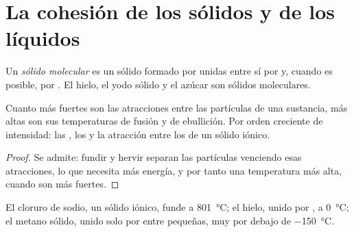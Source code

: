\section{La cohesión de los sólidos y de los líquidos}

\begin{definition}\label{def:g11:polarity-and-cohesion:molecular-solid}
Un \emph{sólido molecular} es un sólido formado
por  unidas entre sí por  y,
cuando es posible, por . El hielo, el yodo sólido y
el azúcar son sólidos moleculares.
\end{definition}

\begin{proposition}\label{prop:g11:polarity-and-cohesion:cohesion}
Cuanto más fuertes son las atracciones entre las partículas de una
sustancia, más altas son sus temperaturas de fusión y de ebullición. Por
orden creciente de intensidad: las , los
 y la atracción entre los  de un sólido
iónico.
\end{proposition}

\begin{proof}
Se admite: fundir y hervir separan las partículas venciendo esas
atracciones, lo que necesita más energía, y por tanto una temperatura
más alta, cuando son más fuertes.
\end{proof}

\begin{example}\label{ex:g11:polarity-and-cohesion:three}
El cloruro de sodio, un sólido iónico, funde a \qty{801}{\celsius}; el
hielo, unido por , a \qty{0}{\celsius}; el metano
sólido, unido solo por  entre 
pequeñas, muy por debajo de \qty{-150}{\celsius}.
\end{example}

